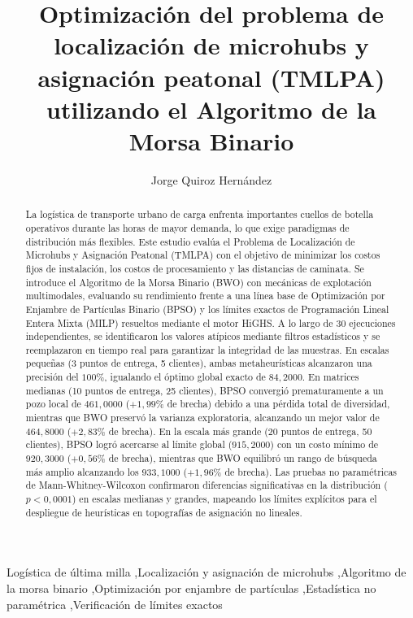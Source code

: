 \documentclass[final,5p,times,twocolumn]{elsarticle}
\def\corref#1{}%
\begin{document}
\begin{frontmatter}

\title{Optimización del problema de localización de microhubs y asignación peatonal (TMLPA) utilizando el Algoritmo de la Morsa Binario}


\author[uv]{Jorge Quiroz Hernández\corref{cor}}

\address[uv]{Escuela de Ingeniería Informática, Universidad de Valparaíso, Chile.}

\begin{abstract}
La logística de transporte urbano de carga enfrenta importantes cuellos de botella operativos durante las horas de mayor demanda, lo que exige paradigmas de distribución más flexibles. Este estudio evalúa el Problema de Localización de Microhubs y Asignación Peatonal (TMLPA) con el objetivo de minimizar los costos fijos de instalación, los costos de procesamiento y las distancias de caminata. Se introduce el Algoritmo de la Morsa Binario (BWO) con mecánicas de explotación multimodales, evaluando su rendimiento frente a una línea base de Optimización por Enjambre de Partículas Binario (BPSO) y los límites exactos de Programación Lineal Entera Mixta (MILP) resueltos mediante el motor HiGHS. A lo largo de 30 ejecuciones independientes, se identificaron los valores atípicos mediante filtros estadísticos y se reemplazaron en tiempo real para garantizar la integridad de las muestras. En escalas pequeñas (3 puntos de entrega, 5 clientes), ambas metaheurísticas alcanzaron una precisión del $100\%$, igualando el óptimo global exacto de $84,2000$. En matrices medianas (10 puntos de entrega, 25 clientes), BPSO convergió prematuramente a un pozo local de $461,0000$ ($+1,99\%$ de brecha) debido a una pérdida total de diversidad, mientras que BWO preservó la varianza exploratoria, alcanzando un mejor valor de $464,8000$ ($+2,83\%$ de brecha). En la escala más grande (20 puntos de entrega, 50 clientes), BPSO logró acercarse al límite global ($915,2000$) con un costo mínimo de $920,3000$ ($+0,56\%$ de brecha), mientras que BWO equilibró un rango de búsqueda más amplio alcanzando los $933,1000$ ($+1,96\%$ de brecha). Las pruebas no paramétricas de Mann-Whitney-Wilcoxon confirmaron diferencias significativas en la distribución ($p < 0,0001$) en escalas medianas y grandes, mapeando los límites explícitos para el despliegue de heurísticas en topografías de asignación no lineales.
\end{abstract}

\begin{keyword}
Logística de última milla \sep Localización y asignación de microhubs \sep Algoritmo de la morsa binario \sep Optimización por enjambre de partículas \sep Estadística no paramétrica \sep Verificación de límites exactos
\end{keyword}

\end{frontmatter}
\end{document}
